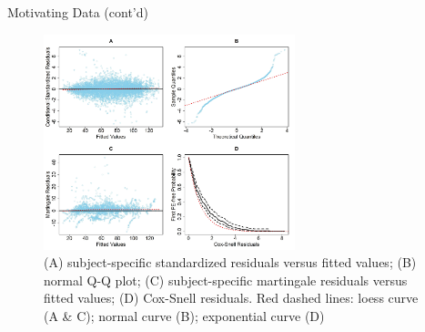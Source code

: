 \documentclass[fleqn]{beamer}
\begin{document}
\begin{frame}{Motivating Data (cont'd)}
    \begin{figure}[H]
    \includegraphics[width=0.65\textwidth]{Figures/Chp3_DIAG.jpg}
    \caption{\tiny (A) subject-specific standardized residuals versus fitted values; (B) normal Q-Q plot; (C) subject-specific martingale residuals versus fitted values; (D) Cox-Snell residuals. Red dashed lines: loess curve (A \& C); normal curve (B); exponential curve (D)}
    \end{figure}
\end{frame}
\end{document}
